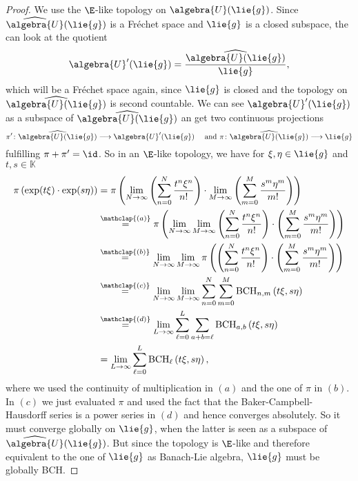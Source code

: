 \documentclass[
11pt,                          %
english                        %
]{article}
\newcommand{\bchpart}[3]{\mathrm{BCH}_{#1}\left(#2, #3\right)}
\newcommand{\bchparts}[4]{\mathrm{BCH}_{#1, #2}\left(#3, #4\right)}
\newcommand\ot[2]{\stackrel{\mathclap{#1}}{#2}}
\begin{document}
\begin{proof}
	We use the $\E$-like topology on $\algebra{U}(\lie{g})$.
	Since $\widehat{\algebra{U}}(\lie{g})$ is a Fr\'echet space and $\lie{g}$ is a 
	closed subspace, the can look at the quotient 
	\begin{equation*}
		\algebra{U}'(\lie{g})
		=
		\frac{\widehat{\algebra{U}(\lie{g})}}{\lie{g}},
	\end{equation*}
	which will be a Fr\'echet space again, since $\lie{g}$ is closed and the 
	topology on $\widehat{\algebra{U}(\lie{g})}$ is second countable. We can see 
	$\algebra{U}'(\lie{g})$ as a subspace of $\widehat{\algebra{U}(\lie{g})}$ an 
	get two continuous projections
	\begin{equation*}
		\pi' \colon
		\widehat{\algebra{U}(\lie{g})}
		\longrightarrow
		\algebra{U}'(\lie{g})
		\quad \text{ and }
		\pi \colon
		\widehat{\algebra{U}(\lie{g})}
		\longrightarrow
		\lie{g}
	\end{equation*}
	fulfilling $\pi + \pi' = \id$. So in an $\E$-like topology, we have for $\xi, 
	\eta \in \lie{g}$ and $t,s \in \mathbb{K}$
	\begin{align*}
		\pi \left( \exp(t \xi) \cdot \exp(s \eta) \right)
		& =
		\pi
		\left(
			\lim_{N \rightarrow \infty}
			\left(
				\sum\limits_{n=0}^N
				\frac{t^n \xi^n}{n!}
			\right)
			\cdot
			\lim_{M \rightarrow \infty}
			\left(
				\sum\limits_{m=0}^M
				\frac{s^m \eta^m}{m!}
			\right)
		\right)
		\\
		& \ot{(a)}{=}
		\pi
		\left(
			\lim_{N \rightarrow \infty}
			\lim_{M \rightarrow \infty}
			\left(
				\sum\limits_{n=0}^N
				\frac{t^n \xi^n}{n!}
			\right)
			\cdot
			\left(
				\sum\limits_{m=0}^M
				\frac{s^m \eta^m}{m!}
			\right)
		\right)
		\\
		& \ot{(b)}{=}
		\lim_{N \rightarrow \infty}
		\lim_{M \rightarrow \infty}
		\pi
		\left(	
			\left(
				\sum\limits_{n=0}^N
				\frac{t^n \xi^n}{n!}
			\right)
			\cdot
			\left(
				\sum\limits_{m=0}^M
				\frac{s^m \eta^m}{m!}
			\right)
		\right)
		\\
		& \ot{(c)}{=}
		\lim_{N \rightarrow \infty}
		\lim_{M \rightarrow \infty}
		\sum\limits_{n=0}^{N}
		\sum\limits_{m=0}^{M}
		\bchparts{n}{m}{t \xi}{s \eta}
		\\
		& \ot{(d)}{=}
		\lim_{L \rightarrow \infty}
		\sum\limits_{\ell=0}^{L}
		\sum\limits_{a + b = \ell}
		\bchparts{a}{b}{t \xi}{s \eta}
		\\
		& =
		\lim_{L \rightarrow \infty}
		\sum\limits_{\ell=0}^{L}
		\bchpart{\ell}{t \xi}{s \eta},
	\end{align*}
	where we used the continuity of multiplication in $(a)$ and the one of $\pi$ in 
	$(b)$. In $(c)$ we just evaluated $\pi$ and used the fact that the 
	Baker-Campbell-Hausdorff series is a power series in $(d)$ and hence converges 
	absolutely. So it must converge globally on $\lie{g}$, when the latter is seen 
	as a subspace of $\widehat{\algebra{U}}(\lie{g})$. But since the topology is 
	$\E$-like and therefore equivalent to the one of $\lie{g}$ as Banach-Lie 
	algebra, $\lie{g}$ must be globally BCH.
\end{proof}
\end{document}

